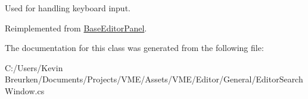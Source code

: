 Used for handling keyboard input. 



Reimplemented from \hyperlink{class_base_editor_panel_a9bd01437be0e246418dc89209ef2125b}{Base\+Editor\+Panel}.



The documentation for this class was generated from the following file\+:\begin{DoxyCompactItemize}
\item 
C\+:/\+Users/\+Kevin Breurken/\+Documents/\+Projects/\+V\+M\+E/\+Assets/\+V\+M\+E/\+Editor/\+General/Editor\+Search\+Window.\+cs\end{DoxyCompactItemize}
